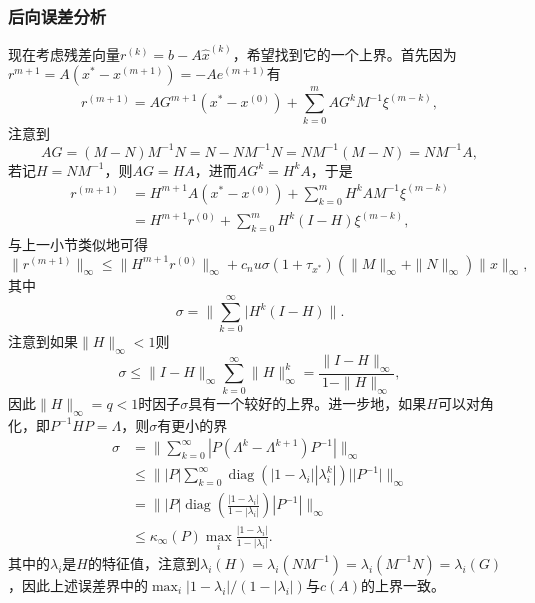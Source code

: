 \documentclass[a4paper,10pt]{ctexart}
\begin{document}
\subsubsection{后向误差分析}
现在考虑残差向量$ r^{(k)} = b - A \hat{x}^{(k)} $，希望找到它的一个上界。首先因为$ r^{m+1}= A(x^* - x^{(m+1)}) = -A e^{(m+1)} $有
\[
    r^{(m+1)}  = AG^{m+1}(x^* - x^{(0)})+\sum_{k=0}^m AG^k M^{-1}\xi^{(m-k)},
\]
注意到
\[
    AG = (M-N)M^{-1}N = N-NM^{-1}N = NM^{-1}(M-N) = NM^{-1}A,
\]
若记$ H = NM^{-1} $，则$ AG = HA $，进而$ AG^k = H^kA $，于是
\[
    \begin{aligned}
        r^{(m+1)} &= H^{m+1}A(x^* - x^{(0)})+\sum_{k=0}^m H^k AM^{-1}\xi^{(m-k)}\\
        &=H^{m+1}r^{(0)} + \sum_{k=0}^m H^k (I - H)\xi^{(m-k)},
    \end{aligned}
\]
与上一小节类似地可得
\begin{equation}\label{eq:backerror}
    \| r^{(m+1)} \|_\infty \leqslant \| H^{m+1} r^{(0)} \|_\infty + c_n u \sigma(1+\tau_{x^*})(\| M \|_\infty + \| N \|_\infty)\| x \|_\infty,
\end{equation}
其中
\[
    \sigma = \| \sum_{k=0}^\infty |H^k (I-H) \| .
\]
注意到如果$ \| H \|_\infty<1 $则
\[
    \sigma\leqslant \| I-H \|_\infty \sum_{k=0}^\infty \| H \|_\infty^k = \frac{\| I-H \|_\infty}{1-\| H \|_\infty},
\]
因此$ \| H \|_\infty = q<1 $时因子$ \sigma $具有一个较好的上界。进一步地，如果$ H $可以对角化，即$ P^{-1}HP = \Lambda $，则$ \sigma $有更小的界
\[
    \begin{aligned}
        \sigma &= \| \sum_{k=0}^\infty |P(\Lambda^k - \Lambda^{k+1})P^{-1}| \|_\infty\\
        &\leqslant \| |P| \sum_{k=0}^\infty \operatorname{diag}(|1-\lambda_i||\lambda_i^k|)| |P^{-1}| \|_\infty\\
        &= \| |P| \operatorname{diag}(\frac{|1-\lambda_i|}{1-|\lambda_i|}) |P^{-1}| \|_\infty\\
        &\leqslant \kappa_\infty(P) \max_i \frac{|1-\lambda_i|}{1-|\lambda_i|}.
    \end{aligned}
\]
其中的$ \lambda_i $是$ H $的特征值，注意到$ \lambda_i(H) = \lambda_i(NM^{-1}) = \lambda_i(M^{-1}N) = \lambda_i(G) $，因此上述误差界中的$ \max_i |1-\lambda_i| /(1-|\lambda_i|) $与$ c(A) $的上界一致。
\end{document}
